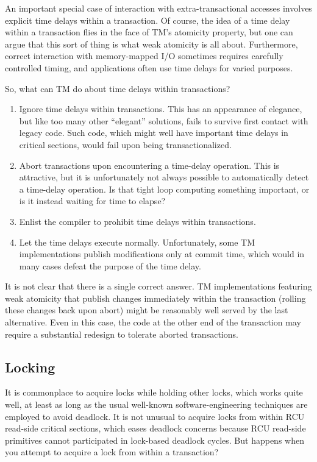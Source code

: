 An important special case of interaction with extra-transactional accesses
involves explicit time delays within a transaction.
Of course, the idea of a time delay within a transaction flies in the
face of TM's atomicity property, but one can argue that this sort of
thing is what weak atomicity is all about.
Furthermore, correct interaction with memory-mapped I/O sometimes requires
carefully controlled timing, and applications often use time delays
for varied purposes.

So, what can TM do about time delays within transactions?

\begin{enumerate}
\item	Ignore time delays within transactions.
	This has an appearance of elegance, but like too many other
	``elegant'' solutions, fails to survive first contact with
	legacy code.
	Such code, which might well have important time delays in critical
	sections, would fail upon being transactionalized.
\item	Abort transactions upon encountering a time-delay operation.
	This is attractive, but it is unfortunately not always possible
	to automatically detect a time-delay operation.
	Is that tight loop computing something important, or is it
	instead waiting for time to elapse?
\item	Enlist the compiler to prohibit time delays within transactions.
\item	Let the time delays execute normally.
	Unfortunately, some TM implementations publish modifications only
	at commit time, which would in many cases defeat the purpose of
	the time delay.
\end{enumerate}

It is not clear that there is a single correct answer.
TM implementations featuring weak atomicity that publish changes
immediately within the transaction (rolling these changes back upon abort)
might be reasonably well served by the last alternative.
Even in this case, the code at the other end of the transaction may
require a substantial redesign to tolerate aborted transactions.

\subsection{Locking}
\label{sec:future:Locking}

It is commonplace to acquire locks while holding other locks, which works
quite well, at least as long as the usual well-known software-engineering
techniques are employed to avoid deadlock.
It is not unusual to acquire locks from within RCU read-side critical
sections, which eases deadlock concerns because RCU read-side primitives
cannot participated in lock-based deadlock cycles.
But happens when you attempt to acquire a lock from within a transaction?

